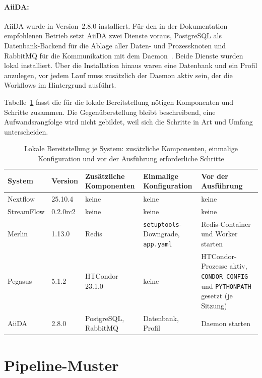 \paragraph{AiiDA:} AiiDA wurde in Version~2.8.0 installiert. Für den in der Dokumentation empfohlenen Betrieb setzt AiiDA zwei Dienste voraus, PostgreSQL als Datenbank-Backend für die Ablage aller Daten- und Prozessknoten und RabbitMQ für die Kommunikation mit dem Daemon~\cite{aiidadocs-install}. Beide Dienste wurden lokal installiert. Über die Installation hinaus waren eine Datenbank und ein Profil anzulegen, vor jedem Lauf muss zusätzlich der Daemon aktiv sein, der die Workflows im Hintergrund ausführt.

Tabelle~\ref{tab:lokal:dienste} fasst die für die lokale
Bereitstellung nötigen Komponenten und Schritte zusammen. Die
Gegenüberstellung bleibt beschreibend, eine Aufwandsrangfolge wird
nicht gebildet, weil sich die Schritte in Art und Umfang
unterscheiden.

\begin{table}[ht]
  \caption{Lokale Bereitstellung je System: zusätzliche Komponenten, einmalige Konfiguration und vor der Ausführung erforderliche Schritte}
  \label{tab:lokal:dienste}
  \centering
  \setlength{\tabcolsep}{4pt}
  \footnotesize
  \renewcommand{\arraystretch}{1.3}
  \begin{tabular}{l l p{2.6cm} p{3.0cm} p{3.4cm}}
    \hline
    \textbf{System} & \textbf{Version} & \textbf{Zusätzliche Komponenten} & \textbf{Einmalige Konfiguration} & \textbf{Vor der Ausführung} \\
    \hline
    Nextflow   & 25.10.4  & keine & keine & keine \\
    StreamFlow & 0.2.0rc2 & keine & keine & keine \\
    Merlin     & 1.13.0   & Redis & \texttt{setuptools}-Downgrade, \texttt{app.yaml} & Redis-Container und Worker starten \\
    Pegasus    & 5.1.2    & HTCondor 23.1.0 & keine & HTCondor-Prozesse aktiv, \texttt{CONDOR\_CONFIG} und \texttt{PYTHONPATH} gesetzt (je Sitzung) \\
    AiiDA      & 2.8.0    & PostgreSQL, RabbitMQ & Datenbank, Profil & Daemon starten \\
    \hline
  \end{tabular}
\end{table}


\section{Pipeline-Muster}
\label{sec:lokal:pipeline}

